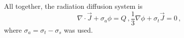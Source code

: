 \documentclass[../doc.tex]{subfiles}
\begin{document}
All together, the radiation diffusion system is 
	\begin{subequations}
	\begin{equation}
		\nabla\cdot\vec{J} + \sigma_a \phi = Q \,, 
	\end{equation}
	\begin{equation}
		\frac{1}{3}\nabla\phi + \sigma_t \vec{J} = 0 \,, 
	\end{equation}
	\end{subequations}
where $\sigma_a = \sigma_t - \sigma_s$ was used. 
\end{document}
